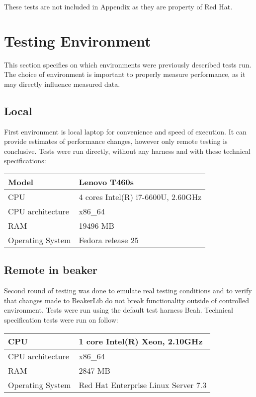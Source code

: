These tests are not included in Appendix as they are property of Red Hat.

\section{Testing Environment}
This section specifies on which environments were previously described tests run. The choice of environment is important to properly measure performance, as it may directly influence measured data.

\subsection{Local}
First environment is local laptop for convenience and speed of execution. It can provide estimates of performance changes, however only remote testing is conclusive. Tests were run directly, without any harness and with these technical specifications: 

\begin{center}
    \begin{tabular}{| l | l |}
    \hline
    Model & Lenovo T460s \\ \hline
    CPU & 4 cores Intel(R) i7-6600U, 2.60GHz \\ \hline
    CPU architecture & x86\_64 \\ \hline
    RAM & 19496 MB   \\ \hline
    Operating System & Fedora release 25 \\ \hline
    \end{tabular}
\end{center}

\subsection{Remote in beaker}
Second round of testing was done to emulate real testing conditions and to verify that changes made to BeakerLib do not break functionality outside of controlled environment. Tests were run using the default test harness Beah. Technical specification tests were run on follow:

\begin{center}
    \begin{tabular}{| l | l |}
    \hline
    CPU & 1 core Intel(R) Xeon, 2.10GHz \\ \hline
    CPU architecture & x86\_64 \\ \hline
    RAM & 2847 MB   \\ \hline
    Operating System & Red Hat Enterprise Linux Server 7.3 \\ \hline
    \end{tabular}
\end{center}


